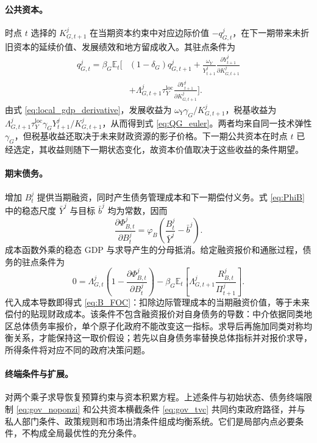 \documentclass[12pt,UTF8]{ctexart}
\newcommand{\E}{\mathbb{E}}
\begin{document}
	\paragraph{公共资本。}
	时点 $t$ 选择的 $K_{G,t+1}^j$ 在当期资本约束中对应边际价值 $-q_{G,t}^j$，在下一期带来未折旧资本的延续价值、发展绩效和地方留成收入。其驻点条件为
	\begin{align*}
		q_{G,t}^j=\beta_G \E_t\Bigg[
		&(1-\delta_G)q_{G,t+1}^j
		+\frac{\omega_Y}{Y_{t+1}^j}
		\frac{\partial Y_{t+1}^j}{\partial K_{G,t+1}^j}\\
		&+\Lambda_{G,t+1}^j\tau_Y^{\mathrm{loc}}
		\frac{\partial Y_{t+1}^j}{\partial K_{G,t+1}^j}
		\Bigg].
	\end{align*}
	由式 \eqref{eq:local_gdp_derivative}，发展收益为 $\omega_Y\gamma_G/K_{G,t+1}^j$，税基收益为 $\Lambda_{G,t+1}^j\tau_Y^{\mathrm{loc}}\gamma_G Y_{t+1}^j/K_{G,t+1}^j$，从而得到式 \eqref{eq:QG_euler}。两者均来自同一技术弹性 $\gamma_G$，但税基收益还取决于未来财政资源的影子价格。下一期公共资本在时点 $t$ 已经选定，其收益则随下一期状态变化，故资本价值取决于这些收益的条件期望。
	
	\paragraph{期末债务。}
	增加 $B_t^j$ 提供当期融资，同时产生债务管理成本和下一期偿付义务。式 \eqref{eq:PhiB} 中的稳态尺度 $\bar Y^j$ 与目标 $\bar b^j$ 均为常数，因而
	\begin{equation*}
		\frac{\partial\Phi_{B,t}^j}{\partial B_t^j}
		=\varphi_B\left(\frac{B_t^j}{\bar Y^j}-\bar b^j\right).
	\end{equation*}
	成本函数外乘的稳态 GDP 与求导产生的分母抵消。给定融资报价和通胀过程，债务的驻点条件为
	\begin{equation*}
		0=\Lambda_{G,t}^j\left(1-\frac{\partial\Phi_{B,t}^j}{\partial B_t^j}\right)
		-\beta_G \E_t\left[\Lambda_{G,t+1}^j\frac{R_{B,t}^j}{\Pi_{t+1}^j}\right].
	\end{equation*}
	代入成本导数即得式 \eqref{eq:B_FOC}：扣除边际管理成本的当期融资价值，等于未来偿付的贴现财政成本。该条件不包含融资报价对自身债务的导数：中介依据同类地区总体债务率报价，单个原子化政府不能改变这一指标。求导后再施加同类对称均衡关系，才能保持这一取价假设；若先以自身债务率替换总体指标并对报价求导，所得条件将对应不同的政府决策问题。
	
	\paragraph{终端条件与扩展。}
	对两个乘子求导恢复预算约束与资本积累方程。上述条件与初始状态、债务终端限制 \eqref{eq:gov_noponzi} 和公共资本横截条件 \eqref{eq:gov_tvc} 共同约束政府路径，并与私人部门条件、政策规则和市场出清条件组成均衡系统。它们是局部内点必要条件，不构成全局最优性的充分条件。
	
\end{document}
